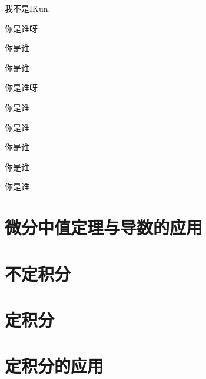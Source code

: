 \documentclass[lang=cn,10pt]{elegantbook}
\begin{document}
\begin{assumption}
	我不是IKun.
\end{assumption}

\begin{property}
	你是谁呀
\end{property}

\begin{solution}
	你是谁
\end{solution}

\begin{example}
	你是谁
\end{example}

\begin{problem}
	你是谁呀
\end{problem}

\begin{exercise}
	你是谁
\end{exercise}

\begin{theorem}
	你是谁
\end{theorem}

\begin{lemma}
	你是谁
\end{lemma}

\begin{corollary}
	你是谁
\end{corollary}

\begin{axiom}
	你是谁
\end{axiom}








\chapter{微分中值定理与导数的应用}



\chapter{不定积分}


\chapter{定积分}




\chapter{定积分的应用}
\end{document}
